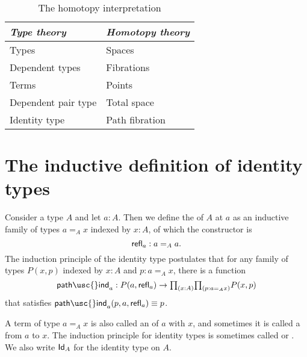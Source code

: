 \begin{table}
\begin{center}
\caption{\label{tab:homotopy_interpretation}The homotopy interpretation}
\begin{tabular}{ll}
\toprule
\emph{Type theory} &  \emph{Homotopy theory} \\
\midrule
Types  & Spaces \\
Dependent types & Fibrations \\
Terms & Points \\
Dependent pair type & Total space \\
Identity type & Path fibration\\
\bottomrule
\end{tabular}
\end{center}
\end{table}

\section{The inductive definition of identity types}

\begin{defn}
  Consider a type $A$ and let $a:A$. Then we define the  of $A$ at $a$ as an inductive family of types $a =_A x$ indexed by $x:A$, of which the constructor is
  \begin{equation*}
    \mathsf{refl}_{a}:a=_Aa.
  \end{equation*}
  The induction principle of the identity type postulates that for any family of types $P(x,p)$ indexed by $x:A$ and $p:a=_A x$, there is a function
  \begin{equation*}
    \mathsf{path\usc{}ind}_a:P(a,\refl{a}) \to \prd{x:A}{p:a=_A x} P(x,p)
  \end{equation*}
  that satisfies $\mathsf{path\usc{}ind}_a(p,a,\refl{a})\jdeq p$.

  A term of type $a=_A x$ is also called an  of $a$ with $x$, and sometimes it is called a  from $a$ to $x$.
The induction principle for identity types is sometimes called  or . We also write $\mathsf{Id}_{A}$ for the identity type on $A$.
\end{defn}

